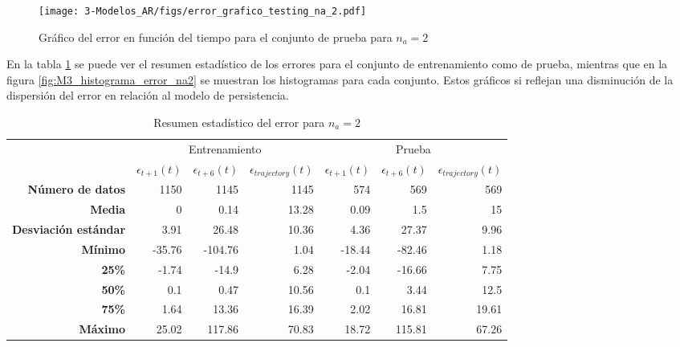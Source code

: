 \begin{figure}[H]
	\centering
	\texttt{[image: 3-Modelos\_AR/figs/error\_grafico\_testing\_na\_2.pdf]}
	\caption{Gráfico del error en función del tiempo para el conjunto de prueba para $n_a=2$}
	\label{fig:M3_error_test_na2}
\end{figure}


En la tabla \ref{table:M3_error_na2} se puede ver el resumen estadístico de los errores para el conjunto de entrenamiento como de prueba, mientras que en la figura \ref{fig:M3_histograma_error_na2} se muestran los histogramas para cada conjunto. Estos gráficos si reflejan una disminución de la dispersión del error en relación al modelo de persistencia.

\begin{table}[H]
	\centering
	\begin{tabular}{rrrr|rrr}
		\hline \hline
		& \multicolumn{3}{c|}{Entrenamiento} & \multicolumn{3}{c}{Prueba} \\
		& $\epsilon_{t+1}(t)$  & $\epsilon_{t+6}(t)$       & $\epsilon_{trajectory}(t)$     & $\epsilon_{t+1}(t)$      & $\epsilon_{t+6}(t)$      &$\epsilon_{trajectory}(t)$     \\ \hline
		\textbf{Número de datos}     & 1150       & 1145      & 1145      & 574     & 569     & 569    \\
		\textbf{Media}               & 0 	      & 0.14      & 13.28     & 0.09    & 1.5     & 15     \\
		\textbf{Desviación estándar} & 3.91       & 26.48     & 10.36     & 4.36    & 27.37   & 9.96   \\
		\textbf{Mínimo}              & -35.76     & -104.76   & 1.04      & -18.44  & -82.46  & 1.18   \\
		\textbf{25\%}                & -1.74      & -14.9     & 6.28      & -2.04   & -16.66  & 7.75   \\
		\textbf{50\%}                & 0.1        & 0.47      & 10.56     & 0.1     & 3.44    & 12.5   \\
		\textbf{75\%}                & 1.64       & 13.36     & 16.39     & 2.02    & 16.81   & 19.61  \\
		\textbf{Máximo}              & 25.02      & 117.86    & 70.83     & 18.72   & 115.81  & 67.26  \\ \hline \hline
	\end{tabular}
	\caption{Resumen estadístico del error para $n_a=2$}
	\label{table:M3_error_na2}
\end{table}




